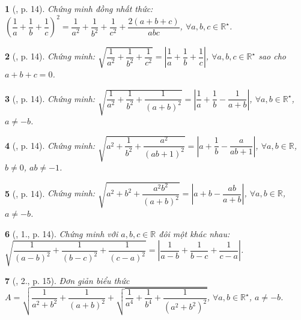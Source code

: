 \documentclass{article}
\newtheorem{baitoan}{}%
\begin{document}
\begin{baitoan}[\cite{Binh_boi_duong_Toan_9_tap_1}, p. 14]
	Chứng minh đồng nhất thức: $\left(\dfrac{1}{a} + \dfrac{1}{b} + \dfrac{1}{c}\right)^2 = \dfrac{1}{a^2} + \dfrac{1}{b^2} + \dfrac{1}{c^2} + \dfrac{2(a + b + c)}{abc}$, $\forall a,b,c\in\mathbb{R}^\star$.
\end{baitoan}

\begin{baitoan}[\cite{Binh_boi_duong_Toan_9_tap_1}, p. 14]
	Chứng minh: $\sqrt{\dfrac{1}{a^2} + \dfrac{1}{b^2} + \dfrac{1}{c^2}} = \left|\dfrac{1}{a} + \dfrac{1}{b} + \dfrac{1}{c}\right|$, $\forall a,b,c\in\mathbb{R}^\star$ sao cho $a + b + c = 0$.
\end{baitoan}

\begin{baitoan}[\cite{Binh_boi_duong_Toan_9_tap_1}, p. 14]
	Chứng minh: $\sqrt{\dfrac{1}{a^2} + \dfrac{1}{b^2} + \dfrac{1}{(a + b)^2}} = \left|\dfrac{1}{a} + \dfrac{1}{b} - \dfrac{1}{a + b}\right|$, $\forall a,b\in\mathbb{R}^\star$, $a\ne-b$.
\end{baitoan}

\begin{baitoan}[\cite{Binh_boi_duong_Toan_9_tap_1}, p. 14]
	Chứng minh: $\sqrt{a^2 + \dfrac{1}{b^2} + \dfrac{a^2}{(ab + 1)^2}} = \left|a + \dfrac{1}{b} - \dfrac{a}{ab + 1}\right|$, $\forall a,b\in\mathbb{R}$, $b\ne0$, $ab\ne-1$.
\end{baitoan}

\begin{baitoan}[\cite{Binh_boi_duong_Toan_9_tap_1}, p. 14]
	Chứng minh: $\sqrt{a^2 + b^2 + \dfrac{a^2b^2}{(a + b)^2}} = \left|a + b - \dfrac{ab}{a + b}\right|$, $\forall a,b\in\mathbb{R}$, $a\ne-b$.
\end{baitoan}

\begin{baitoan}[\cite{Binh_boi_duong_Toan_9_tap_1}, 1., p. 14]
	Chứng minh với $a,b,c\in\mathbb{R}$ đôi một khác nhau: $\sqrt{\dfrac{1}{(a - b)^2} + \dfrac{1}{(b - c)^2} + \dfrac{1}{(c - a)^2}} = \left|\dfrac{1}{a - b} + \dfrac{1}{b - c} + \dfrac{1}{c - a}\right|$.
\end{baitoan}

\begin{baitoan}[\cite{Binh_boi_duong_Toan_9_tap_1}, 2., p. 15]
	Đơn giản biểu thức $A = \sqrt{\dfrac{1}{a^2 + b^2} + \dfrac{1}{(a + b)^2} + \sqrt{\dfrac{1}{a^4} + \dfrac{1}{b^4} + \dfrac{1}{(a^2 + b^2)^2}}}$, $\forall a,b\in\mathbb{R}^\star$, $a\ne-b$.
\end{baitoan}
\end{document}
